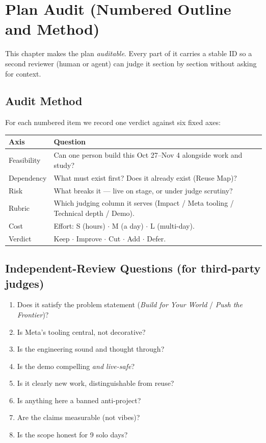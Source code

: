 \chapter{Plan Audit (Numbered Outline and Method)}

This chapter makes the plan \emph{auditable}. Every part of it carries a stable ID so a second
reviewer (human or agent) can judge it section by section without asking for context.

\section{Audit Method}
For each numbered item we record one verdict against six fixed axes:
\begin{longtable}{@{}p{}p{}@{}}
\toprule
Axis & Question \\
\midrule
Feasibility & Can one person build this Oct 27--Nov 4 alongside work and study? \\
Dependency & What must exist first? Does it already exist (Reuse Map)? \\
Risk & What breaks it --- live on stage, or under judge scrutiny? \\
Rubric & Which judging column it serves (Impact / Meta tooling / Technical depth / Demo). \\
Cost & Effort: S (hours) $\cdot$ M (a day) $\cdot$ L (multi-day). \\
Verdict & Keep $\cdot$ Improve $\cdot$ Cut $\cdot$ Add $\cdot$ Defer. \\
\bottomrule
\end{longtable}

\section{Independent-Review Questions (for third-party judges)}
\begin{enumerate}
  \item Does it satisfy the problem statement (\emph{Build for Your World} / \emph{Push the Frontier})?
  \item Is Meta's tooling central, not decorative?
  \item Is the engineering sound and thought through?
  \item Is the demo compelling \emph{and live-safe}?
  \item Is it clearly new work, distinguishable from reuse?
  \item Is anything here a banned anti-project?
  \item Are the claims measurable (not vibes)?
  \item Is the scope honest for 9 solo days?
\end{enumerate}

